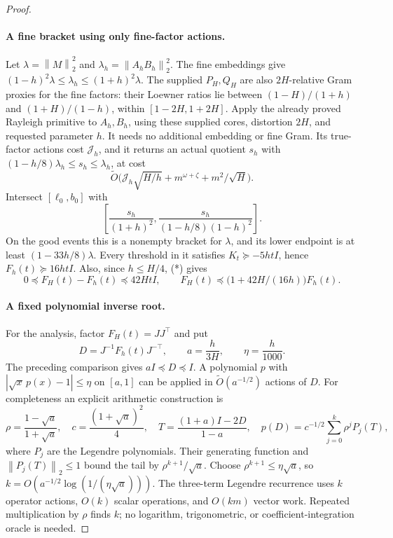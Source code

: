 \documentclass[11pt]{article}
\newcommand{\norm}[1]{\left\lVert#1\right\rVert}
\newcommand{\tO}{\widetilde O}
\begin{document}
\begin{proof}
\paragraph{A fine bracket using only fine-factor actions.}
Let \(\lambda=\norm M_2^2\) and
\(\lambda_h=\norm{A_hB_h}_2^2\). The fine embeddings give
\((1-h)^2\lambda\leq\lambda_h\leq(1+h)^2\lambda\).
The supplied \(P_H,Q_H\) are also \(2H\)-relative Gram proxies for
the fine factors: their Loewner ratios lie between
\((1-H)/(1+h)\) and \((1+H)/(1-h)\), within \([1-2H,1+2H]\).
Apply the already proved Rayleigh primitive to \(A_h,B_h\), using
these supplied cores, distortion \(2H\), and requested parameter \(h\).
It needs no additional embedding or fine Gram. Its true-factor actions
cost \(\mathcal J_h\), and it returns an actual quotient \(s_h\) with
\((1-h/8)\lambda_h\leq s_h\leq\lambda_h\), at cost
\[
 \tO\bigl(\mathcal J_h\sqrt{H/h}+m^{\omega+\zeta}
                                  +m^2/\sqrt H\bigr).
\]
Intersect \([\ell_0,b_0]\) with
\[
 \left[\frac{s_h}{(1+h)^2},
       \frac{s_h}{(1-h/8)(1-h)^2}\right].
\]
On the good events this is a nonempty bracket for \(\lambda\), and its
lower endpoint is at least \((1-33h/8)\lambda\).
Every threshold in it satisfies \(K_t\succeq-5htI\), hence
\(F_h(t)\succeq16htI\). Also, since \(h\leq H/4\), (*) gives
\[
 0\preceq F_H(t)-F_h(t)\preceq42HtI,\qquad
 F_H(t)\preceq\bigl(1+42H/(16h)\bigr)F_h(t).
\]

\paragraph{A fixed polynomial inverse root.}
For the analysis, factor \(F_H(t)=JJ^\top\) and put
\[
 D=J^{-1}F_h(t)J^{-\top},\qquad
 a=\frac{h}{3H},\qquad \eta=\frac h{1000}.
\]
The preceding comparison gives \(aI\preceq D\preceq I\).
A polynomial \(p\) with
\(\left|\sqrt{x}\,p(x)-1\right|\leq\eta\) on \([a,1]\)
can be applied in \(\widetilde O(a^{-1/2})\) actions of \(D\).
For completeness an explicit arithmetic construction is
\[
 \rho=\frac{1-\sqrt a}{1+\sqrt a},\quad
 c=\frac{(1+\sqrt a)^2}{4},\quad
 T=\frac{(1+a)I-2D}{1-a},\quad
 p(D)=c^{-1/2}\sum_{j=0}^{k}\rho^j P_j(T),
\]
where \(P_j\) are the Legendre polynomials. Their generating function
\cite{legendre} and \(\norm{P_j(T)}_2\leq1\) bound the tail by
\(\rho^{k+1}/\sqrt a\). Choose
\(\rho^{k+1}\leq\eta\sqrt a\), so
\(k=O(a^{-1/2}\log(1/(\eta\sqrt a)))\).
The three-term Legendre recurrence uses \(k\) operator actions,
\(O(k)\) scalar operations, and \(O(km)\) vector work. Repeated
multiplication by \(\rho\) finds \(k\); no logarithm, trigonometric,
or coefficient-integration oracle is needed.


\end{proof}
\end{document}

